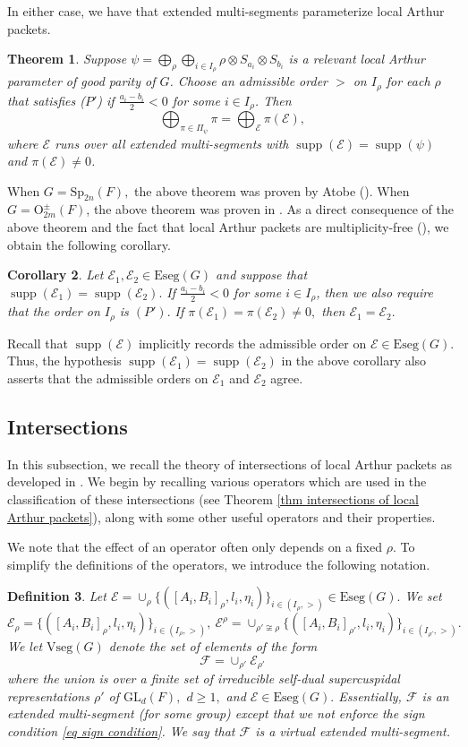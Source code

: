 \documentclass[11pt,letterpaper]{amsart}
\newcommand{\Eseg}{{\mathrm{Eseg}}}
\newcommand{\Vseg}{{\mathrm{Vseg}}}
\newcommand{\GL}{\mathrm{GL}}
\newcommand{\OO}{\mathrm{O}}
\newcommand{\Sp}{\mathrm{Sp}}
\newcommand{\EE}{\mathcal{E}}
\newcommand{\FF}{\mathcal{F}}
\newtheorem{thm}{Theorem}[section]
\newtheorem{cor}[thm]{Corollary}
\newtheorem{defn}[thm]{Definition}
\DeclareMathOperator{\supp}{supp}
\numberwithin{equation}{section}
\begin{document}
In either case, we have that extended multi-segments parameterize local Arthur packets.
\begin{thm}\label{thm Arthur packets extended multi-segment parameterization}
    Suppose $\psi= \bigoplus_{\rho} \bigoplus_{i \in I_{\rho}} \rho \otimes S_{a_i} \otimes S_{b_i}$ is a relevant local Arthur parameter of good parity of $G$. Choose an admissible order $>$ on $I_{\rho}$ for each $\rho$ that satisfies ($P'$) if $\frac{a_i-b_i}{2}<0$ for some $i \in I_{\rho}$. Then
\[ \bigoplus_{\pi \in \Pi_{\psi}} \pi= \bigoplus_{\EE} \pi(\EE),\]
where $\EE$ runs over all extended multi-segments with $\supp(\EE)= \supp(\psi)$ and $\pi(\EE) \neq 0$. 
\end{thm}
When $G=\Sp_{2n}(F),$ the above theorem was proven by Atobe (\cite[Theorem 3.3]{Ato20b}). When $G=\OO_{2m}^\pm(F)$, the above theorem was proven in \cite[Theorem 6.10]{HLL25}.
As a direct consequence of the above theorem and the fact that local Arthur packets are multiplicity-free (\cite{Moe11a}), we obtain the following corollary.
\begin{cor}\label{cor same support}
    Let $\EE_1, \EE_2\in\Eseg(G)$ and suppose that $\supp(\EE_1)=\supp(\EE_2).$ If $\frac{a_i-b_i}{2}<0$ for some $i \in I_{\rho}$, then we also require that the order on $I_\rho$ is $(P').$ If $\pi(\EE_1)=\pi(\EE_2)\neq 0,$ then $\EE_1=\EE_2.$
\end{cor}
Recall that $\supp(\EE)$ implicitly records the admissible order on $\EE\in\Eseg(G)$. Thus, the hypothesis $\supp(\EE_1)=\supp(\EE_2)$ in the above corollary also asserts that the admissible orders on $\EE_1$ and $\EE_2$ agree.


\subsection{Intersections}

In this subsection, we recall the theory of intersections of local Arthur packets as developed in \cite{HLL22, HLL25}. We begin by recalling various operators which are used in the classification of these intersections (see Theorem \ref{thm intersections of local Arthur packets}), along with some other useful operators and their properties.

We note that the effect of an operator often only depends on a fixed $\rho.$ To simplify the definitions of the operators, we introduce the following notation.

\begin{defn}
Let $\EE= \cup_{\rho} \{([A_i,B_i]_{\rho}, l_i, \eta_i)\}_{i \in (I_{\rho},>)}\in\Eseg(G).$
We set
\[ \EE_{\rho}=\{([A_i,B_i]_{\rho}, l_i, \eta_i)\}_{i \in (I_{\rho},>)},\  \EE^{\rho}=\cup_{\rho' \not\cong \rho}\{([A_i,B_i]_{\rho'}, l_i, \eta_i)\}_{i \in (I_{\rho'},>)}. \]
We let $\Vseg(G)$ denote the set of elements of the form \[\FF=\cup_{\rho'} \EE_{\rho'}\]
where the union is over a finite set of irreducible self-dual supercuspidal representations $\rho'$ of $\GL_d(F),$ $d\geq 1,$ and $\EE\in\Eseg(G).$ Essentially, $\mathcal{F}$ is an extended multi-segment (for some group) except that we not enforce the sign condition \eqref{eq sign condition}. We say that $\mathcal{F}$ is a \emph{virtual extended multi-segment}.
\end{defn}
\end{document}
